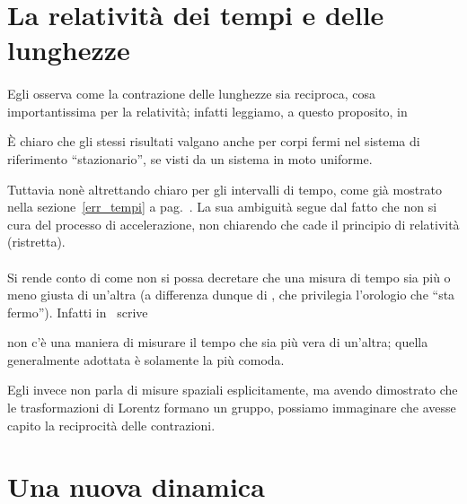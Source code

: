 \section{La relativit\`a dei tempi e delle lunghezze}
\paragraph{\ein} Egli osserva come la contrazione delle lunghezze sia
reciproca, cosa importantissima per la relativit\`a; infatti leggiamo, a
questo proposito, in~\cite{alberto}
\begin{citaz}
  \`E chiaro che gli stessi risultati valgano anche per corpi fermi
  nel sistema di riferimento ``stazionario'', se visti da un sistema
  in moto uniforme.
\end{citaz}
Tuttavia non\`e altrettando chiaro per gli intervalli di tempo, come
gi\`a mostrato nella sezione~\ref{err_tempi} a
pag.~\pageref{err_tempi}. La sua ambiguit\`a segue dal fatto che non si cura
del processo di accelerazione, non chiarendo che cade il
principio di relativit\`a (ristretta).

\paragraph{\poin} Si rende conto
di come non si possa decretare che una misura di tempo sia pi\`u o meno
giusta di un'altra (a differenza dunque di \ein, che privilegia
l'orologio che ``sta fermo''). Infatti in~\cite{carro5} \poin{} scrive
\begin{citaz}
  [\ldots] non c'\`e una maniera di misurare il tempo che sia pi\`u
  vera di un'altra; quella generalmente adottata \`e solamente la
  pi\`u comoda.
\end{citaz}
Egli invece non parla di misure spaziali esplicitamente, ma avendo
dimostrato che le trasformazioni di Lorentz formano un gruppo, possiamo
immaginare che avesse capito la reciprocit\`a delle contrazioni.

\section{Una nuova dinamica}
